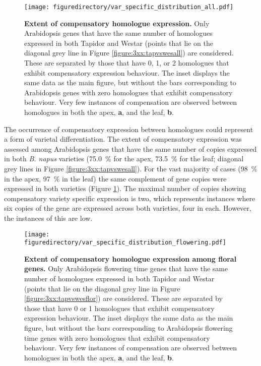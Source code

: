 \documentclass[12pt,]{book}
\begin{document}
\begin{figure}[htbp]
\centering
\texttt{[image: figuredirectory/var\_specific\_distribution\_all.pdf]}
\caption{\textbf{Extent of compensatory homologue expression.} Only
Arabidopsis genes that have the same number of homologues expressed in
both Tapidor and Westar (points that lie on the diagonal grey line in
Figure \ref{figure:3xx:tapvswesall}) are considered. These are separated
by those that have 0, 1, or 2 homologues that exhibit compensatory
expression behaviour. The inset displays the same data as the main
figure, but without the bars corresponding to Arabidopsis genes with
zero homologues that exhibit compensatory behaviour. Very few instances
of compensation are observed between homologues in both the apex,
\textbf{a}, and the leaf, \textbf{b}.}\label{figure:3xx:varspecificall}
\end{figure}

The occurrence of compensatory expression between homologues could
represent a form of varietal differentiation. The extent of compensatory
expression was assessed among Arabidopsis genes that have the same
number of copies expressed in both \emph{B. napus} varieties (75.0~\%
for the apex, 73.5~\% for the leaf; diagonal grey lines in Figure
\ref{figure:3xx:tapvswesall}). For the vast majority of cases (98~\% in
the apex, 97~\% in the leaf) the same complement of gene copies were
expressed in both varieties (Figure \ref{figure:3xx:varspecificall}).
The maximal number of copies showing compensatory variety specific
expression is two, which represents instances where six copies of the
gene are expressed across both varieties, four in each. However, the
instances of this are low.

\begin{figure}[htbp]
\centering
\texttt{[image: figuredirectory/var\_specific\_distribution\_flowering.pdf]}
\caption{\textbf{Extent of compensatory homologue expression among
floral genes.} Only Arabidopsis flowering time genes that have the same
number of homologues expressed in both Tapidor and Westar (points that
lie on the diagonal grey line in Figure \ref{figure:3xx:tapvswesflor})
are considered. These are separated by those that have 0 or 1 homologues
that exhibit compensatory expression behaviour. The inset displays the
same data as the main figure, but without the bars corresponding to
Arabidopsis flowering time genes with zero homologues that exhibit
compensatory behaviour. Very few instances of compensation are observed
between homologues in both the apex, \textbf{a}, and the leaf,
\textbf{b}.}\label{figure:3xx:varspecificflor}
\end{figure}
\end{document}
